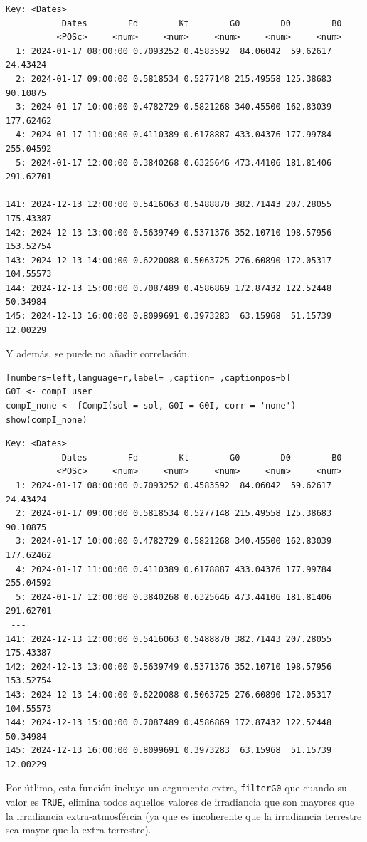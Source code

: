 \begin{itemize}
\begin{verbatim}
Key: <Dates>
		   Dates        Fd        Kt        G0        D0        B0
		  <POSc>     <num>     <num>     <num>     <num>     <num>
  1: 2024-01-17 08:00:00 0.7093252 0.4583592  84.06042  59.62617  24.43424
  2: 2024-01-17 09:00:00 0.5818534 0.5277148 215.49558 125.38683  90.10875
  3: 2024-01-17 10:00:00 0.4782729 0.5821268 340.45500 162.83039 177.62462
  4: 2024-01-17 11:00:00 0.4110389 0.6178887 433.04376 177.99784 255.04592
  5: 2024-01-17 12:00:00 0.3840268 0.6325646 473.44106 181.81406 291.62701
 ---                                                                      
141: 2024-12-13 12:00:00 0.5416063 0.5488870 382.71443 207.28055 175.43387
142: 2024-12-13 13:00:00 0.5639749 0.5371376 352.10710 198.57956 153.52754
143: 2024-12-13 14:00:00 0.6220088 0.5063725 276.60890 172.05317 104.55573
144: 2024-12-13 15:00:00 0.7087489 0.4586869 172.87432 122.52448  50.34984
145: 2024-12-13 16:00:00 0.8099691 0.3973283  63.15968  51.15739  12.00229
\end{verbatim}

Y además, se puede no añadir correlación.
\begin{lstlisting}[numbers=left,language=r,label= ,caption= ,captionpos=b]
G0I <- compI_user
compI_none <- fCompI(sol = sol, G0I = G0I, corr = 'none')
show(compI_none)
\end{lstlisting}

\begin{verbatim}
Key: <Dates>
		   Dates        Fd        Kt        G0        D0        B0
		  <POSc>     <num>     <num>     <num>     <num>     <num>
  1: 2024-01-17 08:00:00 0.7093252 0.4583592  84.06042  59.62617  24.43424
  2: 2024-01-17 09:00:00 0.5818534 0.5277148 215.49558 125.38683  90.10875
  3: 2024-01-17 10:00:00 0.4782729 0.5821268 340.45500 162.83039 177.62462
  4: 2024-01-17 11:00:00 0.4110389 0.6178887 433.04376 177.99784 255.04592
  5: 2024-01-17 12:00:00 0.3840268 0.6325646 473.44106 181.81406 291.62701
 ---                                                                      
141: 2024-12-13 12:00:00 0.5416063 0.5488870 382.71443 207.28055 175.43387
142: 2024-12-13 13:00:00 0.5639749 0.5371376 352.10710 198.57956 153.52754
143: 2024-12-13 14:00:00 0.6220088 0.5063725 276.60890 172.05317 104.55573
144: 2024-12-13 15:00:00 0.7087489 0.4586869 172.87432 122.52448  50.34984
145: 2024-12-13 16:00:00 0.8099691 0.3973283  63.15968  51.15739  12.00229
\end{verbatim}

Por útlimo, esta función incluye un argumento extra, \texttt{filterG0} que cuando su valor es \texttt{TRUE}, elimina todos aquellos valores de irradiancia que son mayores que la irradiancia extra-atmosfércia (ya que es incoherente que la irradiancia terrestre sea mayor que la extra-terrestre).
\end{itemize}


